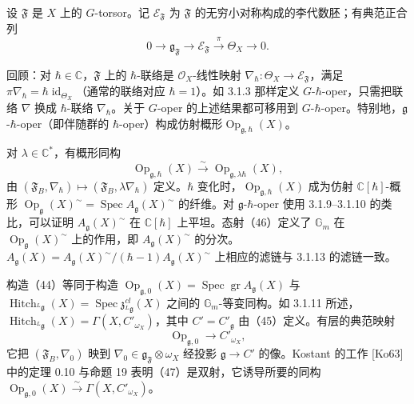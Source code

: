设 $\mathfrak{F}$ 是 $X$ 上的 $G$-torsor。记 $\mathcal{E}_{\mathfrak{F}}$ 为 $\mathfrak{F}$ 的无穷小对称构成的李代数胚；有典范正合列
\[
0 \to \mathfrak{g}_{\mathfrak{F}} \to \mathcal{E}_{\mathfrak{F}} \xrightarrow{\pi} \Theta_X \to 0.
\]

回顾：对 $\hbar \in \mathbb{C}$，$\mathfrak{F}$ 上的 $\hbar$-联络是 $\mathcal{O}_X$-线性映射 $\nabla_{\hbar}: \Theta_X \to \mathcal{E}_{\mathfrak{F}}$，满足 $\pi\nabla_{\hbar} = \hbar\operatorname{id}_{\Theta_X}$（通常的联络对应 $\hbar = 1$）。如 3.1.3 那样定义 $G$-$\hbar$-oper，只需把联络 $\nabla$ 换成 $\hbar$-联络 $\nabla_{\hbar}$。关于 $G$-oper 的上述结果都可移用到 $G$-$\hbar$-oper。特别地，$\mathfrak{g}$-$\hbar$-oper（即伴随群的 $\hbar$-oper）构成仿射概形$\operatorname{Op}_{\mathfrak{g},\hbar}(X)$。

对 $\lambda \in \mathbb{C}^*$，有概形同构
\begin{equation}\tag{46}
\operatorname{Op}_{\mathfrak{g},\hbar}(X) \xrightarrow{\sim} \operatorname{Op}_{\mathfrak{g},\lambda\hbar}(X),
\end{equation}
由 $(\mathfrak{F}_B,\nabla_{\hbar}) \mapsto (\mathfrak{F}_B,\lambda\nabla_{\hbar})$ 定义。$\hbar$ 变化时，$\operatorname{Op}_{\mathfrak{g},\hbar}(X)$ 成为仿射 $\mathbb{C}[\hbar]$-概形 $\operatorname{Op}_{\mathfrak{g}}(X)^{\sim} = \operatorname{Spec} A_{\mathfrak{g}}(X)^{\sim}$ 的纤维。对 $\mathfrak{g}$-$\hbar$-oper 使用 3.1.9--3.1.10 的类比，可以证明 $A_{\mathfrak{g}}(X)^{\sim}$ 在 $\mathbb{C}[\hbar]$ 上平坦。态射（46）定义了 $\mathbb{G}_m$ 在 $\operatorname{Op}_{\mathfrak{g}}(X)^{\sim}$ 上的作用，即 $A_{\mathfrak{g}}(X)^{\sim}$ 的分次。$A_{\mathfrak{g}}(X) = A_{\mathfrak{g}}(X)^{\sim}/(\hbar-1)A_{\mathfrak{g}}(X)^{\sim}$ 上相应的滤链与 3.1.13 的滤链一致。

构造（44）等同于构造 $\operatorname{Op}_{\mathfrak{g},0}(X) = \operatorname{Spec}\operatorname{gr} A_{\mathfrak{g}}(X)$ 与 $\operatorname{Hitch}_{{}^{L}\mathfrak{g}}(X) = \operatorname{Spec}\mathfrak{z}^{cl}_{{}^{L}\mathfrak{g}}(X)$ 之间的 $\mathbb{G}_m$-等变同构。如 3.1.11 所述，$\operatorname{Hitch}_{{}^{L}\mathfrak{g}}(X) = \Gamma(X,C'_{\omega_X})$，其中 $C' = C'_{\mathfrak{g}}$ 由（45）定义。有层的典范映射
\begin{equation}\tag{47}
\operatorname{Op}_{\mathfrak{g},0} \longrightarrow C'_{\omega_X},
\end{equation}
它把 $(\mathfrak{F}_B,\nabla_0)$ 映到 $\nabla_0 \in \mathfrak{g}_{\mathfrak{F}}\otimes\omega_X$ 经投影 $\mathfrak{g} \to C'$ 的像。Kostant 的工作 [Ko63] 中的定理 0.10 与命题 19 表明（47）是双射，它诱导所要的同构 $\operatorname{Op}_{\mathfrak{g},0}(X) \xrightarrow{\sim} \Gamma(X,C'_{\omega_X})$。

